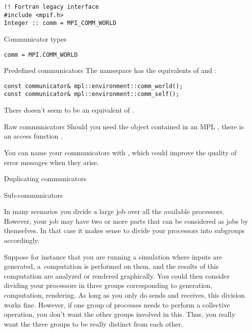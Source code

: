 \begin{lstlisting}
!! Fortran legacy interface
#include <mpif.h>
Integer :: comm = MPI_COMM_WORLD
\end{lstlisting}
\lstset{language=C}

\begin{pythonnote}{Communicator types}
\lstset{language=python}
\begin{lstlisting}
comm = MPI.COMM_WORLD
\end{lstlisting}
\end{pythonnote}

\begin{mplnote}{Predefined communicators}
  The  namespace has the equivalents
  of  and :
\begin{lstlisting}
const communicator& mpl::environment::comm_world();
const communicator& mpl::environment::comm_self();    
\end{lstlisting}
There doesn't seem to be an equivalent of .
\end{mplnote}

\begin{mplnote}{Raw communicators}
  Should you need the  object
  contained in an MPL ,
  there is an access function .
\end{mplnote}

You can name your communicators with , which
could improve the quality of error messages when they arise.

 {Duplicating communicators}
\label{sec:comm-dup}



 {Sub-communicators}
\label{sec:communicators}

In many scenarios you divide a large job over all the available processors.
However, your job may have two or more parts that can be considered as
jobs by themselves. In that case it makes sense to divide your processors
into subgroups accordingly.

Suppose for instance that you are running a simulation where inputs are generated,
a~computation is performed on them, and the results of this computation
are analyzed or rendered graphically. You could then consider dividing your
processors in three groups corresponding to generation, computation, rendering.
%
As long as you only do sends and receives, this division works fine. However,
if one group of processes needs to perform a collective operation, you don't
want the other groups involved in this. Thus, you really want the three groups
to be really distinct from each other.

